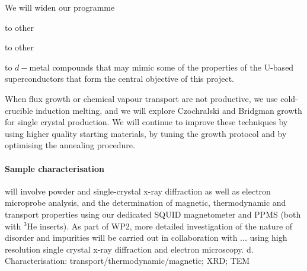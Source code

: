 \vspace{0.5em}
\noindent 
We will widen our  programme
\begin{leftlist}
\item to other %
\item   to  other %
\item to 
 $d-$metal compounds that may mimic some of the properties of the U-based superconductors that form the central objective of this project.
\end{leftlist}
When flux growth or chemical vapour transport are not productive, we use cold-crucible %
induction melting, and we will
explore Czochralski and Bridgman growth for single crystal production. We will continue to improve these techniques by using higher quality starting materials, by tuning the growth protocol and by optimising the annealing procedure.  


\paragraph {Sample characterisation} will involve powder and
single-crystal x-ray diffraction as well as electron microprobe analysis,
and the determination of magnetic, thermodynamic and transport
properties using our dedicated
SQUID magnetometer and PPMS (both with $^3$He inserts).  
As part of WP2, more detailed investigation of the nature of disorder and impurities will be carried out in collaboration with ... using high resolution single crystal x-ray diffraction and electron microscopy.
d. Characterisation: transport/thermodynamic/magnetic; XRD; TEM


